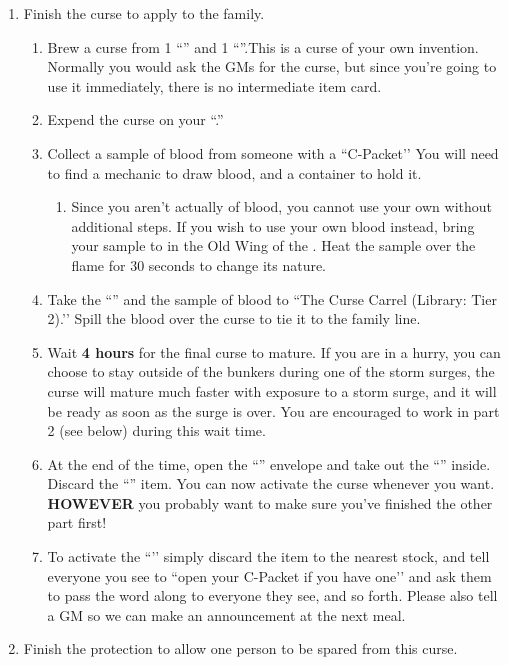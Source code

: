 \documentclass[green]{GL2020}
\begin{document}
\begin{enumerate}
  \item Finish the curse to apply to the \cAdopted{\formal} family.
  \begin{enumerate}    \item Brew a curse from 1 ``\iFlameOrchid{}'' and 1 ``\iObsidian{}''.This is a curse of your own invention. Normally you would ask the GMs for the curse, but since you're going to use it immediately, there is no intermediate item card.
    \item Expend the curse on your ``\iWIPCurse{}.''
    \item Collect a sample of blood from someone with a ``C-Packet’’ You will need to find a mechanic to draw blood, and a container to hold it. 
  \begin{enumerate}
    \item Since you aren’t actually of \cMusic{\formal} blood, you cannot use your own without additional steps. If you wish to use your own blood instead, bring your sample to \sPFlameTwo{} in the Old Wing of the \pSc{}. Heat the sample over the flame for 30 seconds to change its nature.
  \end{enumerate}
    \item Take the ``\iWIPCurse{}'' and the sample of blood to ``The Curse Carrel (Library: Tier 2).’’ Spill the blood over the curse to tie it to the \cAdopted{\formal} family line.
    \item Wait \textbf{4 hours} for the final curse to mature. If you are in a hurry, you can choose to stay outside of the bunkers during one of the storm surges, the curse will mature much faster with exposure to a storm surge, and it will be ready as soon as the surge is over. You are encouraged to work in part 2 (see below) during this wait time.
    \item At the end of the time, open the ``\iWIPCurse{}'' envelope and take out the ``\iWithering{}'' inside. Discard the ``\iWIPCurse{}'' item. You can now activate the curse whenever you want. \textbf{HOWEVER} you probably want to make sure you’ve finished the other part first!
    \item To activate the ``\iWithering{}’’ simply discard the item to the nearest stock, and tell everyone you see to ``open your C-Packet if you have one’’ and ask them to pass the word along to everyone they see, and so forth. Please also tell a GM so we can make an announcement at the next meal.
  \end{enumerate}
  \item Finish the protection to allow one person to be spared from this curse.

\end{enumerate}
\end{document}
